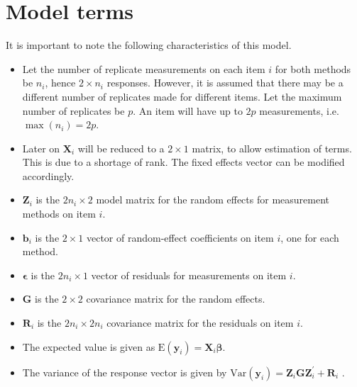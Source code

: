 \documentclass[12pt, a4paper]{report}
\theoremstyle{plain}
\theoremstyle{definition}
\theoremstyle{remark}
\begin{document}
	
	
	\newpage
	
	\section{Model terms}
	It is important to note the following characteristics of this model.
	\begin{itemize}
		\item Let the number of replicate measurements on each item $i$ for both methods be $n_i$, hence $2 \times n_i$ responses. However, it is assumed that there may be a different number of replicates made for different items. Let the maximum number of replicates be $p$. An item will have up to $2p$ measurements, i.e. $\max(n_{i}) = 2p$.
		
		
		\item Later on $\boldsymbol{X}_i$ will be reduced to a $2 \times 1$ matrix, to allow estimation of terms. This is due to a shortage of rank. The fixed effects vector can be modified accordingly.
		\item $\boldsymbol{Z}_i$ is the $2n_i \times  2$ model matrix for the random effects for measurement methods on item $i$.
		\item $\boldsymbol{b}_i$ is the $2 \times  1$ vector of random-effect coefficients on item $i$, one for each method.
		\item $\boldsymbol{\epsilon}$  is the $2n_i \times  1$ vector of residuals for measurements on item $i$.
		\item $\boldsymbol{G}$ is the $2 \times  2$ covariance matrix for the random effects.
		\item $\boldsymbol{R}_i$ is the $2n_i \times  2n_i$ covariance matrix for the residuals on item $i$.
		\item The expected value is given as $\mbox{E}(\boldsymbol{y}_i) = \boldsymbol{X}_i\boldsymbol{\beta}.$ \citep{hamlett}
		\item The variance of the response vector is given by $\mbox{Var}(\boldsymbol{y}_i)  = \boldsymbol{Z}_i \boldsymbol{G} \boldsymbol{Z}_i^{\prime} + \boldsymbol{R}_i$ \citep{hamlett}.
	\end{itemize}
	
\end{document}

